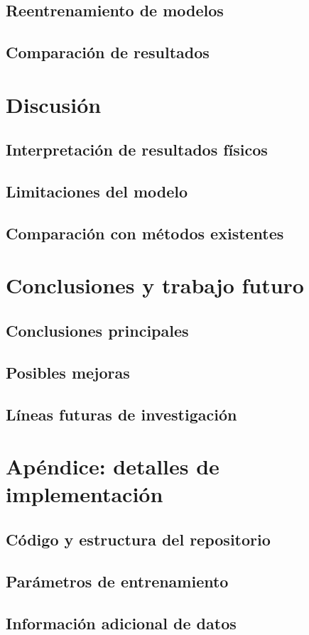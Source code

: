 \documentclass{article}
\begin{document}
\subsection{Reentrenamiento de modelos}
\subsection{Comparación de resultados}



\newpage
\section{Discusión}
\subsection{Interpretación de resultados físicos}
\subsection{Limitaciones del modelo}
\subsection{Comparación con métodos existentes}



\newpage
\section{Conclusiones y trabajo futuro}
\subsection{Conclusiones principales}
\subsection{Posibles mejoras}
\subsection{Líneas futuras de investigación}



\newpage
\printbibliography[title={Referencias}]





\newpage
\appendix
\section{Apéndice: detalles de implementación}
\subsection{Código y estructura del repositorio}
\subsection{Parámetros de entrenamiento}
\subsection{Información adicional de datos}
\end{document}
